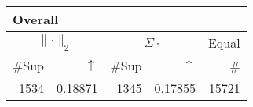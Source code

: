 \begin{center}
\renewcommand{\tabcolsep}{4pt}
\renewcommand{\arraystretch}{1.1}
\begin{customnormal}
\begin{tabular}{rrrrr}
\multicolumn{5}{l}{Overall}\\
\toprule
\multicolumn{2}{c}{$\lVert \cdot \rVert_2$} & \multicolumn{2}{c}{$\Sigma \cdot$} & \multicolumn{1}{c}{Equal} \\ 
\cmidrule(lr){1-2} \cmidrule(lr){3-4} \cmidrule(lr){5-5}
\#Sup & $\uparrow$ & \#Sup & $\uparrow$ & \# \\ 
\midrule
1534 & 0.18871  & 1345 & 0.17855  & 15721 \\ 
\bottomrule
\end{tabular}


\end{customnormal}
\end{center}


